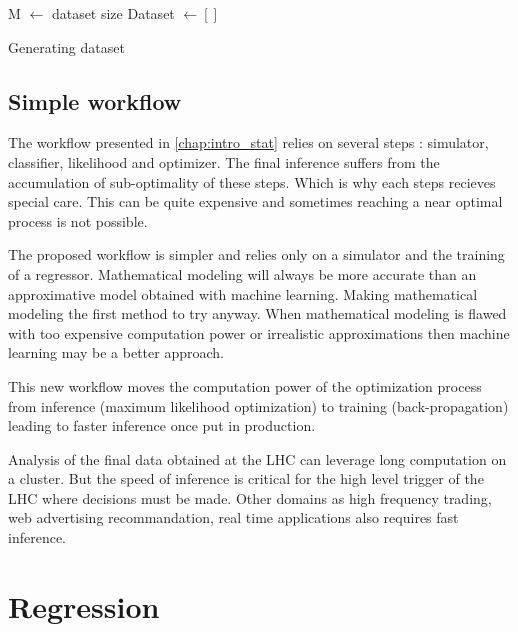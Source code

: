 \begin{algorithm}[H]
 M $\gets$ dataset size \;
 Dataset $\gets []$ \;
 \caption{Generating dataset}
\end{algorithm}








\subsection{Simple workflow} %
\label{sub:simple_workflow}

The workflow presented in \autoref{chap:intro_stat} relies on several steps : simulator, classifier, likelihood and optimizer.
The final inference suffers from the accumulation of sub-optimality of these steps.
Which is why each steps recieves special care.
This can be quite expensive and sometimes reaching a near optimal process is not possible.

The proposed workflow is simpler and relies only on a simulator and the training of a regressor.
Mathematical modeling will always be more accurate than an approximative model obtained with machine learning.
Making mathematical modeling the first method to try anyway.
When mathematical modeling is flawed with too expensive computation power or irrealistic approximations then machine learning may be a better approach.

This new workflow moves the computation power of the optimization process from inference (maximum likelihood optimization) to training (back-propagation) leading to faster inference once put in production.

Analysis of the final data obtained at the LHC can leverage long computation on a cluster.
But the speed of inference is critical for the high level trigger of the LHC where decisions must be made.
Other domains as high frequency trading, web advertising recommandation, real time applications also requires fast inference.




\section{Regression} %
\label{sec:regression}




